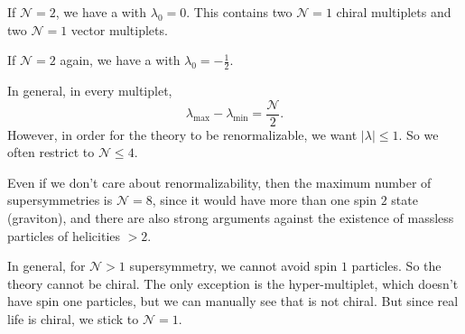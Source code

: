 \documentclass[a4paper]{article}
\begin{document}
\begin{eg}
  If $\mathcal{N} = 2$, we have a  with $\lambda_0 = 0$. This contains two $\mathcal{N} = 1$ chiral multiplets and two $\mathcal{N} = 1$ vector multiplets.
\end{eg}

\begin{eg}
  If $\mathcal{N} = 2$ again, we have a  with $\lambda_0 = -\frac{1}{2}$.
\end{eg}

In general, in every multiplet,
\[
  \lambda_{\mathrm{max}} - \lambda_{\mathrm{min}} = \frac{\mathcal{N}}{2}.
\]
However, in order for the theory to be renormalizable, we want $|\lambda| \leq 1$. So we often restrict to $\mathcal{N} \leq 4$.

Even if we don't care about renormalizability, then the maximum number of supersymmetries is $\mathcal{N} = 8$, since it would have more than one spin $2$ state (graviton), and there are also strong arguments against the existence of massless particles of helicities $> 2$.

In general, for $\mathcal{N} > 1$ supersymmetry, we cannot avoid spin $1$ particles. So the theory cannot be chiral. The only exception is the hyper-multiplet, which doesn't have spin one particles, but we can manually see that is not chiral. But since real life is chiral, we stick to $\mathcal{N} = 1$.
\printindex
\end{document}
